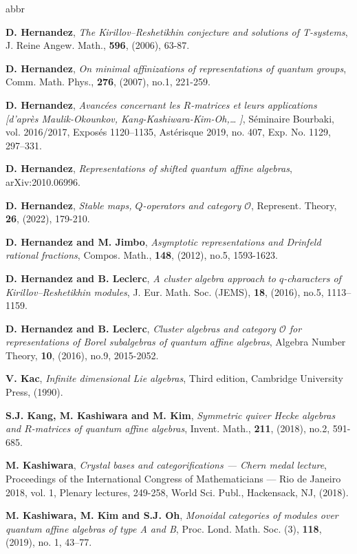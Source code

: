 \documentclass[11pt]{amsart}
\theoremstyle{definition}
\theoremstyle{remark}
\numberwithin{equation}{section}
\begin{document}
\begin{thebibliography}{abbr}
{ {\bf D. Hernandez}, {\it The Kirillov--Reshetikhin conjecture and solutions of T-systems}, J. Reine Angew. Math., \textbf{596}, (2006), 63-87.

 {\bf D. Hernandez}, {\it On minimal affinizations of representations of quantum groups}, Comm. Math. Phys., \textbf{276}, (2007), no.1, 221-259.

 {\bf D. Hernandez}, {\it Avancées concernant les $R$-matrices et leurs applications [d'après Maulik-Okounkov, Kang-Kashiwara-Kim-Oh,… ]}, S\'eminaire Bourbaki, vol. 2016/2017, Exposés 1120–1135, Astérisque 2019, no. 407, Exp. No. 1129, 297–331.

 {\bf D. Hernandez}, {\it Representations of shifted quantum affine algebras}, arXiv:2010.06996.

 {\bf D. Hernandez}, {\it Stable maps, $Q$-operators and category $\mathcal{O}$}, Represent. Theory, \textbf{26}, (2022), 179-210.

 {\bf D. Hernandez and M. Jimbo}, {\it Asymptotic representations and Drinfeld rational fractions}, Compos. Math., \textbf{148}, (2012), no.5, 1593-1623.

 {\bf D. Hernandez and B. Leclerc}, {\it A cluster algebra approach to $q$-characters of Kirillov–Reshetikhin modules}, J. Eur. Math. Soc. (JEMS), \textbf{18}, (2016), no.5, 1113–1159.

 {\bf D. Hernandez and B. Leclerc}, {\it Cluster algebras and category $\mathcal{O}$ for representations of Borel subalgebras of quantum affine algebras}, Algebra Number Theory, \textbf{10}, (2016), no.9, 2015-2052.

 {\bf V. Kac}, {\it Infinite dimensional Lie algebras}, Third edition, Cambridge University Press, (1990).

 {\bf S.J. Kang, M. Kashiwara and M. Kim}, {\it Symmetric quiver Hecke algebras and $R$-matrices of quantum affine algebras}, Invent. Math., \textbf{211}, (2018), no.2, 591-685.

 {\bf M. Kashiwara}, {\it Crystal bases and categorifications --- Chern medal lecture}, Proceedings of the International Congress of Mathematicians --- Rio de Janeiro 2018, vol. 1, Plenary lectures,  249-258, World Sci. Publ., Hackensack, NJ, (2018). 

 {\bf M. Kashiwara, M. Kim and S.J. Oh}, {\it Monoidal categories of modules over quantum affine algebras of type A and B}, Proc. Lond. Math. Soc. (3), \textbf{118}, (2019), no. 1, 43–77.

}
\end{thebibliography}
\end{document}
